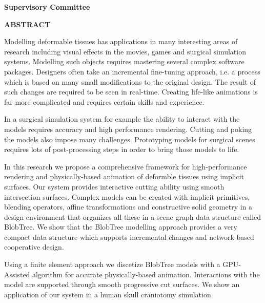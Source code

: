 \newpage
{}

\noindent \textbf{Supervisory Committee}
\tpbreak
\panel

\begin{center}
\textbf{ABSTRACT}
\end{center}
Modelling deformable tissues has applications in many interesting areas of research including visual effects in the movies, games and
surgical simulation systems. Modelling such objects requires mastering several complex software packages.  Designers often take an incremental 
fine-tuning approach, i.e. a process which is based on many small modifications to the original design. The result of such 
changes are required to be seen in real-time. Creating life-like animations is far more complicated and requires certain skills and experience. 

In a surgical simulation system for example the ability to interact with the models requires accuracy and high performance rendering. 
Cutting and poking the models also impose many challenges. Prototyping models for surgical scenes requires lots of post-processing steps 
in order to bring those models to life.

In this research we propose a comprehensive framework for high-performance rendering and physically-based animation of deformble tissues
using implicit surfaces. Our system provides interactive cutting ability using smooth intersection surfaces. 
Complex models can be created with implicit primitives, blending operators, affine transformations and constructive solid geometry 
in a design environment that organizes all these in a scene graph data structure called BlobTree. We show that the BlobTree modelling approach
provides a very compact data structure which supports incremental changes and network-based cooperative design. 

Using a finite element approach we discetize BlobTree models with a GPU-Assisted algorithm for accurate physically-based animation. Interactions with the
model are supported through smooth progressive cut surfaces. We show an application of our system in a human skull craniotomy simulation.



